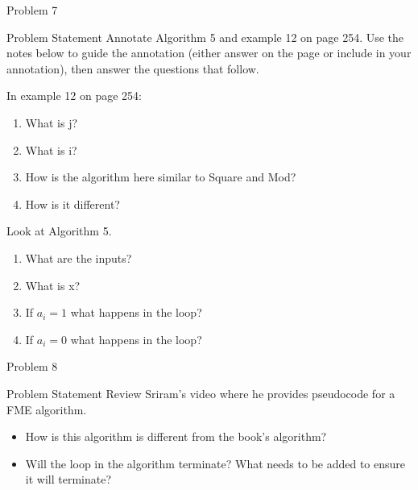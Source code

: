 \begin{problem}{Problem 7}
    \begin{statement}{Problem Statement}
        Annotate Algorithm 5 and example 12 on page 254. Use the notes below to guide the annotation (either answer on the page or include in your annotation), then answer the questions that follow. \vspace*{1em}

        In example 12 on page 254:

        \begin{enumerate}[label = (\alph*)]
            \item What is j?
            \item What is i?
            \item How is the algorithm here similar to Square and Mod?
            \item How is it different?
        \end{enumerate}

        Look at Algorithm 5.

        \begin{enumerate}[label = (\alph*)]
            \item What are the inputs?
            \item What is x?
            \item If $a_{i} = 1$ what happens in the loop?
            \item If $a_{i} = 0$ what happens in the loop?
        \end{enumerate}
    \end{statement}
\end{problem}

\begin{problem}{Problem 8}
    \begin{statement}{Problem Statement}
        Review Sriram’s video where he provides pseudocode for a FME algorithm.

        \begin{itemize}
            \item How is this algorithm is different from the book’s algorithm?
            \item Will the loop in the algorithm terminate? What needs to be added to ensure it will terminate?
        \end{itemize}
    \end{statement}
\end{problem}

